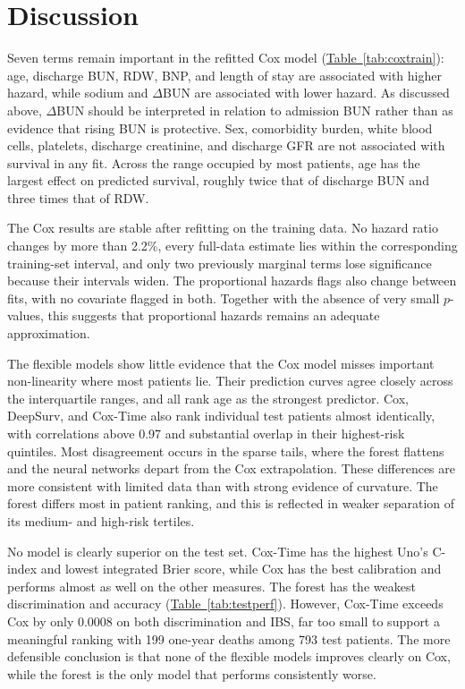 \documentclass[11pt,a4paper]{article}
\newcommand{\tabref}[1]{\hyperref[#1]{Table~\ref*{#1}}}
\newcommand{\dbun}{$\Delta$BUN}
\begin{document}

\section{Discussion}

Seven terms remain important in the refitted Cox model (\tabref{tab:coxtrain}): age, discharge BUN, RDW, BNP, and length of stay are associated with higher hazard, while sodium and \dbun{} are associated with lower hazard. As discussed above, \dbun{} should be interpreted in relation to admission BUN rather than as evidence that rising BUN is protective. Sex, comorbidity burden, white blood cells, platelets, discharge creatinine, and discharge GFR are not associated with survival in any fit. Across the range occupied by most patients, age has the largest effect on predicted survival, roughly twice that of discharge BUN and three times that of RDW.

The Cox results are stable after refitting on the training data. No hazard ratio changes by more than 2.2\%, every full-data estimate lies within the corresponding training-set interval, and only two previously marginal terms lose significance because their intervals widen. The proportional hazards flags also change between fits, with no covariate flagged in both. Together with the absence of very small $p$-values, this suggests that proportional hazards remains an adequate approximation.

The flexible models show little evidence that the Cox model misses important non-linearity where most patients lie. Their prediction curves agree closely across the interquartile ranges, and all rank age as the strongest predictor. Cox, DeepSurv, and Cox-Time also rank individual test patients almost identically, with correlations above 0.97 and substantial overlap in their highest-risk quintiles. Most disagreement occurs in the sparse tails, where the forest flattens and the neural networks depart from the Cox extrapolation. These differences are more consistent with limited data than with strong evidence of curvature. The forest differs most in patient ranking, and this is reflected in weaker separation of its medium- and high-risk tertiles.

No model is clearly superior on the test set. Cox-Time has the highest Uno's C-index and lowest integrated Brier score, while Cox has the best calibration and performs almost as well on the other measures. The forest has the weakest discrimination and accuracy (\tabref{tab:testperf}). However, Cox-Time exceeds Cox by only 0.0008 on both discrimination and IBS, far too small to support a meaningful ranking with 199 one-year deaths among 793 test patients. The more defensible conclusion is that none of the flexible models improves clearly on Cox, while the forest is the only model that performs consistently worse.
\end{document}
